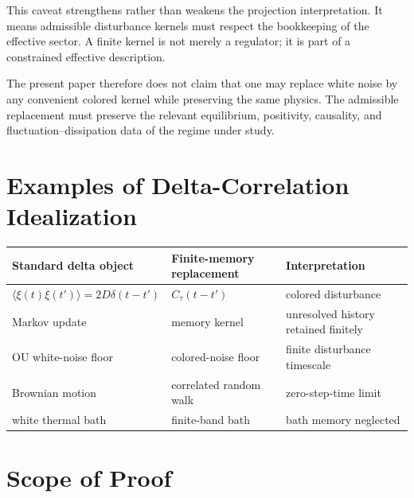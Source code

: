 \documentclass[11pt]{article}
\begin{document}
This caveat strengthens rather than weakens the projection interpretation. It means admissible disturbance kernels must respect the bookkeeping of the effective sector. A finite kernel is not merely a regulator; it is part of a constrained effective description.

The present paper therefore does not claim that one may replace white noise by any convenient colored kernel while preserving the same physics. The admissible replacement must preserve the relevant equilibrium, positivity, causality, and fluctuation--dissipation data of the regime under study.

\section{Examples of Delta-Correlation Idealization}

\begin{center}
\begin{tabular}{lll}
\toprule
Standard delta object & Finite-memory replacement & Interpretation \\
\midrule
\(\langle\xi(t)\xi(t')\rangle=2D\delta(t-t')\) & \(C_\tau(t-t')\) & colored disturbance \\
Markov update & memory kernel & unresolved history retained finitely \\
OU white-noise floor & colored-noise floor & finite disturbance timescale \\
Brownian motion & correlated random walk & zero-step-time limit \\
white thermal bath & finite-band bath & bath memory neglected \\
\bottomrule
\end{tabular}
\end{center}

\section{Scope of Proof}
\end{document}
